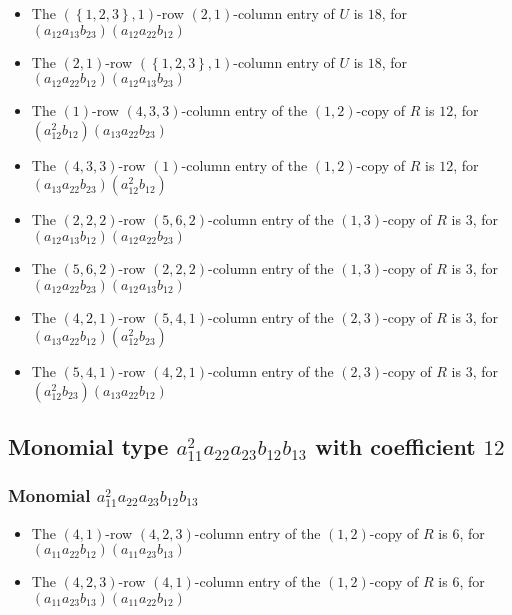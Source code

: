 \documentclass{article}
\begin{document}
\begin{itemize}
\item The $ \left(\left\{1, 2, 3\right\}, 1\right) $-row $ \left(2, 1\right) $-column entry of $U$ is $ 18 $, for $( a_{12} a_{13} b_{23} )( a_{12} a_{22} b_{12} )$ 
\item The $ \left(2, 1\right) $-row $ \left(\left\{1, 2, 3\right\}, 1\right) $-column entry of $U$ is $ 18 $, for $( a_{12} a_{22} b_{12} )( a_{12} a_{13} b_{23} )$ 
\item The $(1)$-row $(4, 3, 3)$-column entry of the $ \left(1, 2\right) $-copy of $R$ is $ 12 $, for $( a_{12}^{2} b_{12} )( a_{13} a_{22} b_{23} )$ 
\item The $(4, 3, 3)$-row $(1)$-column entry of the $ \left(1, 2\right) $-copy of $R$ is $ 12 $, for $( a_{13} a_{22} b_{23} )( a_{12}^{2} b_{12} )$ 
\item The $(2, 2, 2)$-row $(5, 6, 2)$-column entry of the $ \left(1, 3\right) $-copy of $R$ is $ 3 $, for $( a_{12} a_{13} b_{12} )( a_{12} a_{22} b_{23} )$ 
\item The $(5, 6, 2)$-row $(2, 2, 2)$-column entry of the $ \left(1, 3\right) $-copy of $R$ is $ 3 $, for $( a_{12} a_{22} b_{23} )( a_{12} a_{13} b_{12} )$ 
\item The $(4, 2, 1)$-row $(5, 4, 1)$-column entry of the $ \left(2, 3\right) $-copy of $R$ is $ 3 $, for $( a_{13} a_{22} b_{12} )( a_{12}^{2} b_{23} )$ 
\item The $(5, 4, 1)$-row $(4, 2, 1)$-column entry of the $ \left(2, 3\right) $-copy of $R$ is $ 3 $, for $( a_{12}^{2} b_{23} )( a_{13} a_{22} b_{12} )$ 
\end{itemize}
\subsection{Monomial type $ a_{11}^{2} a_{22} a_{23} b_{12} b_{13} $ with coefficient $ 12 $}

\subsubsection{Monomial $ a_{11}^{2} a_{22} a_{23} b_{12} b_{13} $}

\begin{itemize}
\item The $(4, 1)$-row $(4, 2, 3)$-column entry of the $ \left(1, 2\right) $-copy of $R$ is $ 6 $, for $( a_{11} a_{22} b_{12} )( a_{11} a_{23} b_{13} )$ 
\item The $(4, 2, 3)$-row $(4, 1)$-column entry of the $ \left(1, 2\right) $-copy of $R$ is $ 6 $, for $( a_{11} a_{23} b_{13} )( a_{11} a_{22} b_{12} )$ 
\end{itemize}
\end{document}
